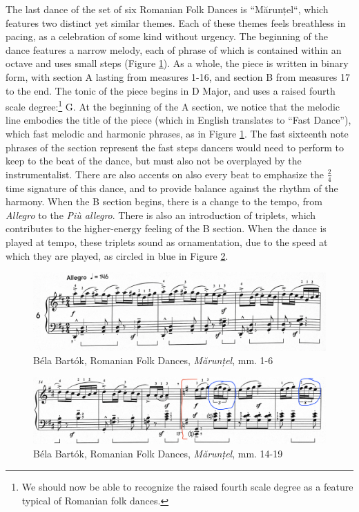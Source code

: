 The last dance of the set of six Romanian Folk Dances is ``Mărunțel``, which features two distinct yet similar themes. Each of these themes feels breathless in pacing, as a celebration of some kind without urgency. The beginning of the dance features a narrow melody, each of phrase of which is contained within an octave and uses small steps (Figure \ref{fig:bartok-dance-six-first-line}\autocite{Lung_2016}). As a whole, the piece is written in binary form, with section A lasting from measures 1-16, and section B from measures 17 to the end. The tonic of the piece begins in D Major, and uses a raised fourth scale degree:\footnote{We should now be able to recognize the raised fourth scale degree as a feature typical of Romanian folk dances.} G\musSharp{}. At the beginning of the A section, we notice that the melodic line embodies the title of the piece (which in English translates to ``Fast Dance''), which fast melodic and harmonic phrases, as in Figure \ref{fig:bartok-dance-six-first-line}\autocite{Lung_2016}. The fast sixteenth note phrases of the section represent the fast steps dancers would need to perform to keep to the beat of the dance, but must also not be overplayed by the instrumentalist. There are also accents on also every beat to emphasize the $\frac{2}{4}$ time signature of this dance, and to provide balance against the rhythm of the harmony. When the B section begins, there is a change to the tempo, from \textit{Allegro} to the \textit{Più allegro}. There is also an introduction of triplets, which contributes to the higher-energy feeling of the B section. When the dance is played at tempo, these triplets sound as ornamentation, due to the speed at which they are played, as circled in blue in Figure \ref{fig:bartok-dance-six-b-section}\autocite{Lung_2016}. 

\begin{figure}
  \centering
  \includegraphics[width=\textwidth]{figures/bartok-dance-six-first-line.jpg}
  \caption{Béla Bartók, Romanian Folk Dances, \textit{Mărunțel}, mm. 1-6}
  \label{fig:bartok-dance-six-first-line}
\end{figure}

\begin{figure}
  \centering
  \includegraphics[width=\textwidth]{figures/bartok-dance-six-b-section.jpg}
  \caption{Béla Bartók, Romanian Folk Dances, \textit{Mărunțel}, mm. 14-19}
  \label{fig:bartok-dance-six-b-section}
\end{figure}

